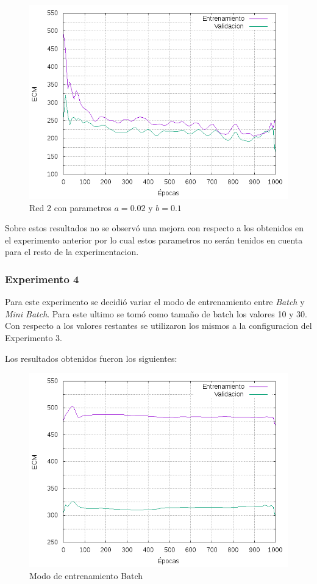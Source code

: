 \begin{figure}[h!]
  \includegraphics[width=125mm]{imagenes/ej1/ex_3-2_red_11-6-6-9-1_errors.png}
  \caption{Red 2 con parametros $a = 0.02 $ y $b = 0.1$}
\end{figure}

Sobre estos resultados no se observó una mejora con respecto a los obtenidos en el experimento anterior por lo cual estos parametros no serán
tenidos en cuenta para el resto de la experimentacion.

\subsubsection{Experimento 4}
Para este experimento se decidió variar el modo de entrenamiento entre \textit{Batch} y \textit{Mini Batch}. Para este ultimo se tomó como tamaño
de batch los valores 10 y 30. Con respecto a los valores restantes se utilizaron los mismos a la configuracion del Experimento 3.

Los resultados obtenidos fueron los siguientes:

\begin{figure}[h!]
  \includegraphics[width=125mm]{imagenes/ej1/ex_4-1_red_11-6-6-9-1_errors.png}
  \caption{Modo de entrenamiento Batch}
\end{figure}

